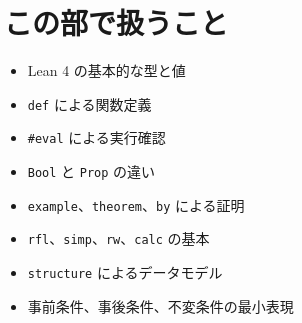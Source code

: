 \section*{この部で扱うこと}

\begin{itemize}
\item Lean 4 の基本的な型と値
\item \texttt{def} による関数定義
\item \texttt{\#eval} による実行確認
\item \texttt{Bool} と \texttt{Prop} の違い
\item \texttt{example}、\texttt{theorem}、\texttt{by} による証明
\item \texttt{rfl}、\texttt{simp}、\texttt{rw}、\texttt{calc} の基本
\item \texttt{structure} によるデータモデル
\item 事前条件、事後条件、不変条件の最小表現
\end{itemize}
